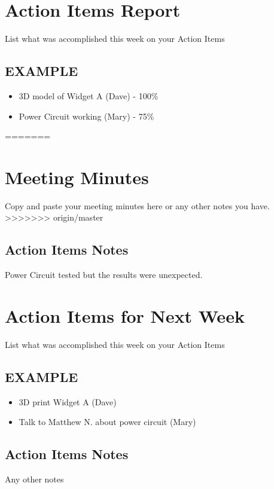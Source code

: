 \documentclass[10pt,a4paper]{article}
\begin{document}
\begin{Form}
\begin{framed}
\section*{Action Items Report}
List what was accomplished this week on your Action Items
\subsection*{EXAMPLE}
\begin{itemize}
\item 3D model of Widget A (Dave) - 100\% 
\item Power Circuit working (Mary) - 75\%
\end{itemize}
=======
\section*{Meeting Minutes}
Copy and paste your meeting minutes here or any other notes you have.
>>>>>>> origin/master

\subsection*{Action Items Notes}
Power Circuit tested but the results were unexpected.
\section*{Action Items for Next Week}
List what was accomplished this week on your Action Items
\subsection*{EXAMPLE}
\begin{itemize}
\item 3D print Widget A (Dave)
\item Talk to Matthew N. about power circuit (Mary)
\end{itemize}
\subsection*{Action Items Notes}
Any other notes

\end{framed}
\end{Form}
\end{document}
